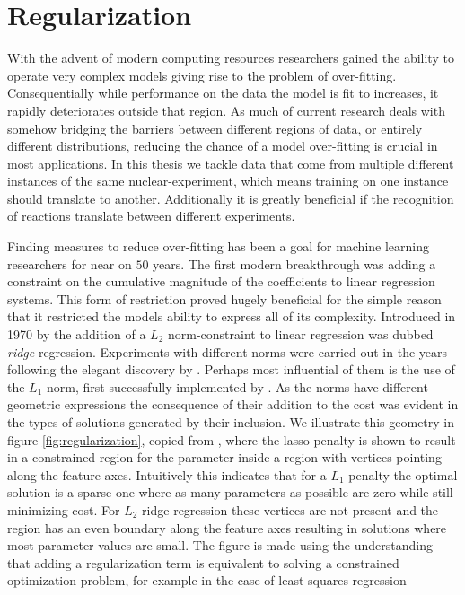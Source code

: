 \section{Regularization}\label{sec:regularization}

With the advent of modern computing resources researchers gained the ability to operate very complex models giving rise to the problem of over-fitting. Consequentially while performance on the data the model is fit to increases, it rapidly deteriorates outside that region. As much of current research deals with somehow bridging the barriers between different regions of data, or entirely different distributions, reducing the chance of a model over-fitting is crucial in most applications. In this thesis we tackle data that come from multiple different instances of the same nuclear-experiment, which means training on one instance should translate to another. Additionally it is greatly beneficial if the recognition of reactions translate between different experiments.   

Finding measures to reduce over-fitting has been a goal for machine learning researchers for near on $50$ years. The first modern breakthrough was adding a constraint on the cumulative magnitude of the coefficients to linear regression systems. This form of restriction proved hugely beneficial for the simple reason that it restricted the models ability to express all of its complexity. Introduced in 1970 by \citet{Hoerl1970} the addition of a $L_2$ norm-constraint to linear regression was dubbed \textit{ridge} regression. Experiments with different norms were carried out in the years following the elegant discovery by \cite{Hoerl1970}. Perhaps most influential of them is the use of the $L_1$-norm, first successfully implemented by \citet{Tibshirani1996}. As the norms have different geometric expressions the consequence of their addition to the cost was evident in the types of solutions generated by their inclusion. We illustrate this geometry in figure \ref{fig:regularization}, copied from \cite{Mehta2019}, where the lasso penalty is shown to result in a constrained region for the parameter inside a region with vertices pointing along the feature axes. Intuitively this indicates that for a $L_1$ penalty the optimal solution is a sparse one where as many parameters as possible are zero while still minimizing cost. For $L_2$ ridge regression these vertices are not present and the region has an even boundary along the feature axes resulting in solutions where most parameter values are small. The figure is made using the understanding that adding a regularization term is equivalent to solving a constrained optimization problem, for example in the case of least squares regression 

